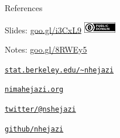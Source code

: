 \documentclass[12pt,t,handout]{beamer}
\begin{document}
\begin{frame}[c,allowframebreaks]{References}

\nocite{*}


\end{frame}



\begin{frame}[c]{}

\Large
Slides: \href{https://goo.gl/i3CxL9}{goo.gl/i3CxL9} \quad
\includegraphics[height=5mm]{Figs/cc-zero.png}

\vspace{5mm}

Notes: \href{https://goo.gl/8RWEy5}{goo.gl/8RWEy5}

\vspace{5mm}

\href{https://www.stat.berkeley.edu/~nhejazi}{\tt stat.berkeley.edu/\textasciitilde{}nhejazi}

\vspace{5mm}

\href{http://nimahejazi.org}{\tt nimahejazi.org}

\vspace{5mm}

\href{https://twitter.com/nshejazi}{\tt twitter/@nshejazi}

\vspace{5mm}

\href{https://github.com/nhejazi}{\tt github/nhejazi}


\end{frame}
\end{document}
